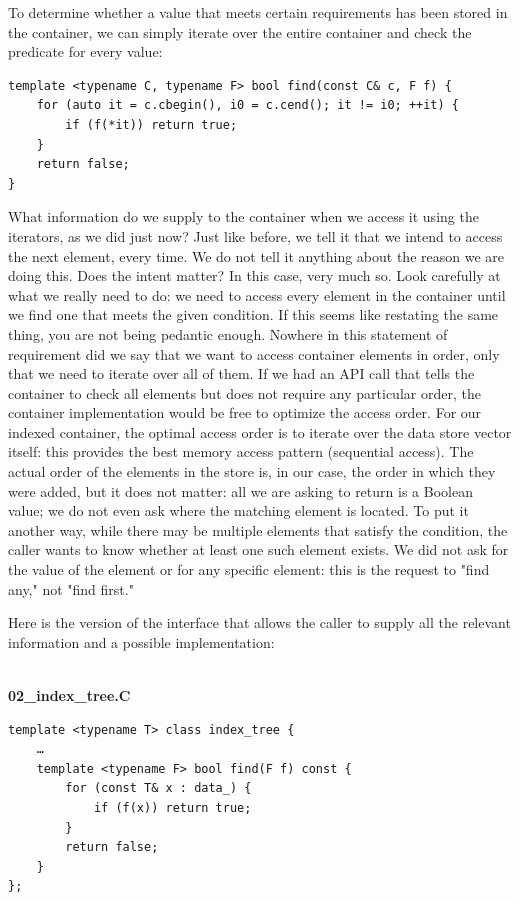 To determine whether a value that meets certain requirements has been stored in the container, we can simply iterate over the entire container and check the predicate for every value:

\begin{lstlisting}[style=styleCXX]
template <typename C, typename F> bool find(const C& c, F f) {
	for (auto it = c.cbegin(), i0 = c.cend(); it != i0; ++it) {
		if (f(*it)) return true;
	}
	return false;
}
\end{lstlisting}

What information do we supply to the container when we access it using the iterators, as we did just now? Just like before, we tell it that we intend to access the next element, every time. We do not tell it anything about the reason we are doing this. Does the intent matter? In this case, very much so. Look carefully at what we really need to do: we need to access every element in the container until we find one that meets the given condition. If this seems like restating the same thing, you are not being pedantic enough. Nowhere in this statement of requirement did we say that we want to access container elements in order, only that we need to iterate over all of them. If we had an API call that tells the container to check all elements but does not require any particular order, the container implementation would be free to optimize the access order. For our indexed container, the optimal access order is to iterate over the data store vector itself: this provides the best memory access pattern (sequential access). The actual order of the elements in the store is, in our case, the order in which they were added, but it does not matter: all we are asking to return is a Boolean value; we do not even ask where the matching element is located. To put it another way, while there may be multiple elements that satisfy the condition, the caller wants to know whether at least one such element exists. We did not ask for the value of the element or for any specific element: this is the request to "find any," not "find first." 

Here is the version of the interface that allows the caller to supply all the relevant information and a possible implementation:

\hspace*{\fill} \\ %
\noindent
\textbf{02\_index\_tree.C}
\begin{lstlisting}[style=styleCXX]
template <typename T> class index_tree {
	…
	template <typename F> bool find(F f) const {
		for (const T& x : data_) {
			if (f(x)) return true;
		}
		return false;
	}
};
\end{lstlisting}

